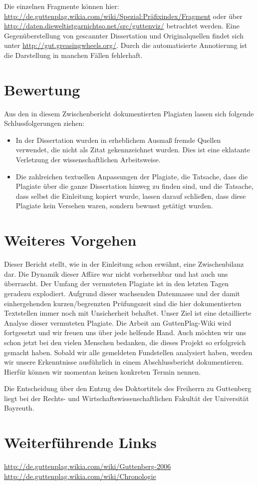 \documentclass[ngerman,final,fontsize=12pt,paper=a4,twoside,BCOR=8mm,draft=false]{scrartcl}
\begin{document}
Die einzelnen Fragmente können hier:
\url{http://de.guttenplag.wikia.com/wiki/Spezial:Präfixindex/Fragment}
oder über \url{http://daten.dieweltistgarnichtso.net/src/guttenviz/}
  betrachtet werden. Eine Gegenüberstellung von gescannter
  Dissertation und Originalquellen findet sich unter
  \url{http://gut.greasingwheels.org/}. Durch die automatisierte Annotierung
  ist die Darstellung in manchen Fällen fehlerhaft.

\section{Bewertung}
Aus den in diesem Zwischenbericht dokumentierten Plagiaten lassen sich folgende Schlussfolgerungen ziehen:
\begin{itemize}
\item In der Dissertation wurden in erheblichem Ausmaß fremde Quellen verwendet, die nicht als Zitat gekennzeichnet wurden. Dies ist eine eklatante Verletzung der wissenschaftlichen Arbeitsweise.
\item Die zahlreichen textuellen Anpassungen der Plagiate, die Tatsache, dass die Plagiate über die ganze Dissertation hinweg zu finden sind, und die Tatsache, dass selbst die Einleitung kopiert wurde, lassen darauf schließen, dass diese Plagiate kein Versehen waren, sondern bewusst getätigt wurden.
\end{itemize}
\section{Weiteres Vorgehen}
Dieser Bericht stellt, wie in der Einleitung schon erwähnt, eine Zwischenbilanz dar. Die Dynamik dieser Affäre war nicht vorhersehbar und hat auch uns überrascht. Der Umfang der vermuteten Plagiate ist in den letzten Tagen geradezu explodiert. Aufgrund dieser wachsenden Datenmasse und der damit einhergehenden kurzen/begrenzten Prüfungszeit sind die hier dokumentierten Textstellen immer noch mit Unsicherheit behaftet. Unser Ziel ist eine detaillierte Analyse dieser vermuteten Plagiate. Die Arbeit am GuttenPlag-Wiki wird fortgesetzt und wir freuen uns über jede helfende Hand. Auch möchten wir uns schon jetzt bei den vielen Menschen bedanken, die dieses Projekt so erfolgreich gemacht haben. Sobald wir alle gemeldeten Fundstellen analysiert haben, werden wir unsere Erkenntnisse ausführlich in einem Abschlussbericht dokumentieren. Hierfür können wir momentan keinen konkreten Termin nennen. 

Die Entscheidung über den Entzug des Doktortitels des Freiherrn zu Guttenberg liegt bei der Rechts- und Wirtschaftswissenschaftlichen Fakultät der Universität Bayreuth.

\section{Weiterführende Links}
 \url{http://de.guttenplag.wikia.com/wiki/Guttenberg-2006}\\
 \url{http://de.guttenplag.wikia.com/wiki/Chronologie}
\end{document}
